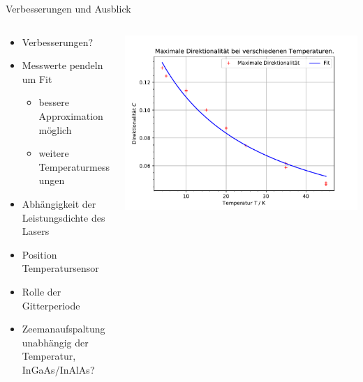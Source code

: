 \begin{frame}{Verbesserungen und Ausblick}
    \begin{columns}
        \begin{column}{0.5\textwidth}
            \begin{itemize}                 
                \item <1-> Verbesserungen?
                \item <2-> Messwerte pendeln um Fit 
                \begin{itemize}
                    \item <3-> \rightarrow bessere Approximation möglich
                    \item <4-> weitere Temperaturmessungen 
                \end{itemize}
                \bigskip
                \item <5-> Abhängigkeit der Leistungsdichte des Lasers
                \item <6-> Position Temperatursensor
                \item <7-> Rolle der Gitterperiode %
                \item <8-> Zeemanaufspaltung unabhängig der Temperatur, InGaAs/InAlAs? 
            \end{itemize}
        \end{column}
        \begin{column}{0.5\textwidth}
            \centering
             {%
            \includegraphics[scale=0.4]{images/Maximale_Rho_bei_Temperaturabhänigkeit.pdf}\\[-0.5\baselineskip]%
            }%
        \end{column}
    \end{columns}
\end{frame}

